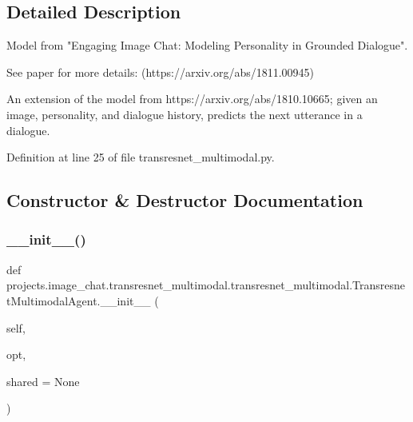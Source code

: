 \subsection{Detailed Description}
\begin{DoxyVerb}Model from "Engaging Image Chat: Modeling Personality in Grounded Dialogue".

See paper for more details: (https://arxiv.org/abs/1811.00945)

An extension of the model from https://arxiv.org/abs/1810.10665; given
an image, personality, and dialogue history, predicts the next utterance
in a dialogue.
\end{DoxyVerb}
 

Definition at line 25 of file transresnet\+\_\+multimodal.\+py.



\subsection{Constructor \& Destructor Documentation}
\mbox{\label{classprojects_1_1image__chat_1_1transresnet__multimodal_1_1transresnet__multimodal_1_1TransresnetMultimodalAgent_aeb8b0b2c932460122db8e86c155c3fa4}} 
\subsubsection{\texorpdfstring{\+\_\+\+\_\+init\+\_\+\+\_\+()}{\_\_init\_\_()}}
{\footnotesize\ttfamily def projects.\+image\+\_\+chat.\+transresnet\+\_\+multimodal.\+transresnet\+\_\+multimodal.\+Transresnet\+Multimodal\+Agent.\+\_\+\+\_\+init\+\_\+\+\_\+ (\begin{DoxyParamCaption}\item[{}]{self,  }\item[{}]{opt,  }\item[{}]{shared = {\ttfamily None} }\end{DoxyParamCaption})}




